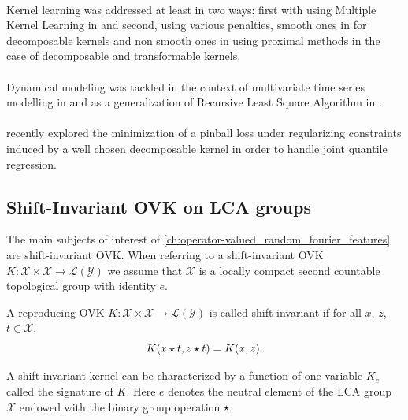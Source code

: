 \paragraph{}
Kernel learning was addressed at least in two ways: first with using Multiple
Kernel Learning in \citet{Kadri_nips2012} and second, using various penalties,
smooth ones in \citet{Dinuzzo2011, ciliberto2015} for decomposable kernels
and non smooth ones in \citet{lim2015operator} using proximal methods in the
case of decomposable and transformable kernels.
\paragraph{}
Dynamical modeling was tackled in the context of multivariate time series
modelling in \citet{lim2013okvar,Sindhwani2013,lim2015operator} and as a
generalization of Recursive Least Square Algorithm in
\citet{amblard2015operator}.
\paragraph{}
\citet{sangnier2016joint} recently explored the minimization of
a pinball loss under regularizing constraints induced by a well chosen
decomposable kernel in order to handle joint quantile regression.

\subsection{Shift-Invariant \acs{OVK} on \acs{LCA}
groups}
The main subjects of interest of
\cref{ch:operator-valued_random_fourier_features} are shift-invariant
\acl{OVK}. When referring to a shift-invariant \ac{OVK}
$K:\mathcal{X}\times\mathcal{X}\to\mathcal{L}(\mathcal{Y})$ we assume that
$\mathcal{X}$ is a locally compact second countable topological group with
identity
$e$.
\begin{definition}
    A reproducing \acl{OVK}
    $K:\mathcal{X}\times\mathcal{X}\to\mathcal{L}(\mathcal{Y})$ is called
    shift-invariant if for all $x$, $z$, $t\in\mathcal{X}$,
    \begin{dmath}
        \label{eq:def_shift_inv}
        K(x\groupop t, z\groupop t) = K(x, z).
    \end{dmath}
\end{definition}
A shift-invariant kernel can be characterized by a function of one variable
$K_e$ called the signature of $K$. Here $e$ denotes the neutral element of the
\ac{LCA} group $\mathcal{X}$ endowed with the binary group operation
$\star$.
